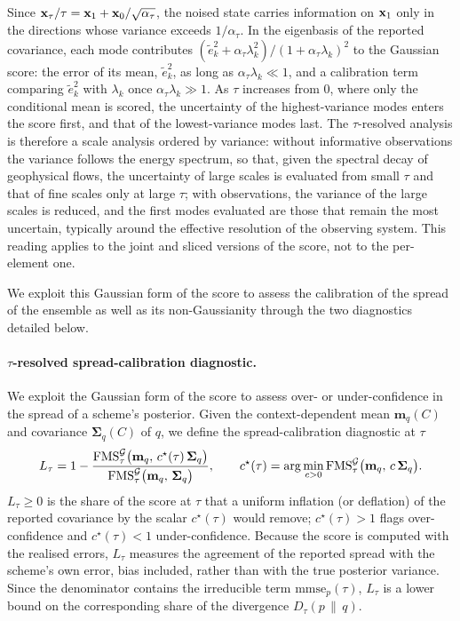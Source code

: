 Since $\mathbf{x}_\tau/\tau = \mathbf{x}_1 + \mathbf{x}_0/\sqrt{\alpha_\tau}$, the noised state carries information on $\mathbf{x}_1$ only in the directions whose variance exceeds $1/\alpha_\tau$. In the eigenbasis of the reported covariance, each mode contributes $(\tilde e_k^2 + \alpha_\tau\lambda_k^2)/(1+\alpha_\tau\lambda_k)^2$ to the Gaussian score: the error of its mean, $\tilde e_k^2$, as long as $\alpha_\tau\lambda_k \ll 1$, and a calibration term comparing $\tilde e_k^2$ with $\lambda_k$ once $\alpha_\tau\lambda_k \gg 1$. As $\tau$ increases from $0$, where only the conditional mean is scored, the uncertainty of the highest-variance modes enters the score first, and that of the lowest-variance modes last. The $\tau$-resolved analysis is therefore a scale analysis ordered by variance: without informative observations the variance follows the energy spectrum, so that, given the spectral decay of geophysical flows, the uncertainty of large scales is evaluated from small $\tau$ and that of fine scales only at large $\tau$; with observations, the variance of the large scales is reduced, and the first modes evaluated are those that remain the most uncertain, typically around the effective resolution of the observing system. This reading applies to the joint and sliced versions of the score, not to the per-element one.

We exploit this Gaussian form of the score to assess the calibration of the spread of the ensemble as well as its non-Gaussianity through the two diagnostics detailed below.

\paragraph{$\tau$-resolved spread-calibration diagnostic.} We exploit the Gaussian form of the score to assess
over- or under-confidence in the spread of a scheme's posterior. Given the
context-dependent mean $\mathbf{m}_q(C)$ and covariance $\boldsymbol{\Sigma}_q(C)$ of
$q$, we define the spread-calibration diagnostic at $\tau$
\begin{equation}\label{eq:calib_loss}
  L_\tau = 1 - \frac{\mathrm{FMS}^{\mathcal{G}}_\tau\big(\mathbf{m}_q,\, c^\star(\tau)\,\boldsymbol{\Sigma}_q\big)}
                    {\mathrm{FMS}^{\mathcal{G}}_\tau\big(\mathbf{m}_q,\, \boldsymbol{\Sigma}_q\big)},
  \qquad
  c^\star(\tau) = \arg\min_{c>0} \mathrm{FMS}^{\mathcal{G}}_\tau\big(\mathbf{m}_q,\, c\,\boldsymbol{\Sigma}_q\big).
\end{equation}
$L_\tau \ge 0$ is the share of the score at $\tau$ that a uniform inflation (or
deflation) of the reported covariance by the scalar $c^\star(\tau)$ would remove;
$c^\star(\tau) > 1$ flags over-confidence and $c^\star(\tau) < 1$ under-confidence. Because the score is computed with the realised errors, $L_\tau$ measures the agreement of the reported spread with the scheme's own error, bias included, rather than with the true posterior variance. Since the denominator contains the irreducible term $\mathrm{mmse}_p(\tau)$, $L_\tau$ is a lower bound on the corresponding share of the divergence $D_\tau(p\,\|\,q)$.

